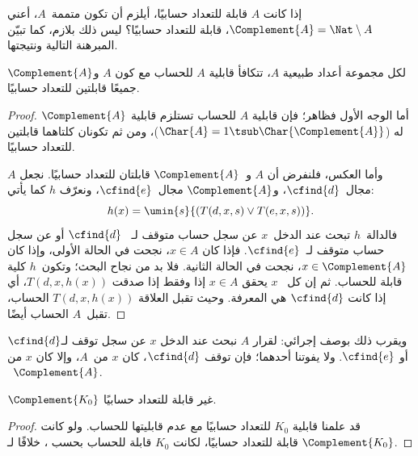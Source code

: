 \documentclass[../../../include/open-logic-section]{subfiles}
\begin{document}

إذا كانت $A$ قابلة للتعداد حسابيًا، أيلزم أن تكون متممة~$A$، أعني
$\Complement{A}=\Nat\setminus A$، قابلة للتعداد حسابيًا؟
ليس ذلك بلازم، كما تبيّن المبرهنة التالية ونتيجتها.

\begin{thm}
لكل مجموعة أعداد طبيعية $A$، تتكافأ قابلية $A$ للحساب
مع كون $A$ و$\Complement{A}$ جميعًا قابلتين للتعداد
حسابيًا.
\end{thm}

\begin{proof}
أما الوجه الأول فظاهر؛ فإن قابلية $A$ للحساب تستلزم قابلية $\Complement{A}$
له ($\Char{A}=1\tsub\Char{\Complement{A}}$)، ومن ثم
تكونان كلتاهما قابلتين للتعداد حسابيًا.

وأما العكس، فلنفرض أن $A$ و~$\Complement{A}$ قابلتان
للتعداد حسابيًا. نجعل $A$ مجال~$\cfind{d}$،
و$\Complement{A}$ مجال~$\cfind{e}$، ونعرّف $h$ كما يأتي:
\[
h(x) = \umin{s}{(T(d,x,s) \lor T(e,x,s))}.
\]
فالدالة~$h$ تبحث عند الدخل~$x$ عن سجل حساب متوقف لـ
~$\cfind{d}$ أو عن سجل حساب متوقف لـ~$\cfind{e}$. فإذا كان $x\in A$،
نجحت في الحالة الأولى، وإذا كان $x\in\Complement{A}$، نجحت في الحالة
الثانية. فلا بد من نجاح البحث؛ وتكون~$h$ كلية قابلة للحساب. ثم إن كل
~$x$ يحقق $x\in A$ إذا وفقط إذا صدقت $T(d,x,h(x))$، أي إذا كانت
$\cfind{d}$ هي المعرفة. وحيث تقبل العلاقة $T(d,x,h(x))$ الحساب،
تقبل~$A$ الحساب أيضًا.
\end{proof}

\begin{explain}
ويقرب ذلك بوصف إجرائي: لقرار $A$ نبحث عند الدخل
$x$ عن سجل توقف لـ$\cfind{d}$ أو $\cfind{e}$. ولا يفوتنا
أحدهما؛ فإن توقف $\cfind{d}$، كان $x$ من~$A$، وإلا كان $x$ من
~$\Complement{A}$.
\end{explain}

\begin{cor}
$\Complement{K_0}$ غير قابلة للتعداد حسابيًا.
\end{cor}

\begin{proof}
قد علمنا قابلية $K_0$ للتعداد حسابيًا مع عدم قابليتها للحساب. ولو كانت
$\Complement{K_0}$ قابلة للتعداد حسابيًا، لكانت $K_0$ قابلة للحساب
بحسب ، خلافًا لـ.
\end{proof}
\end{document}
